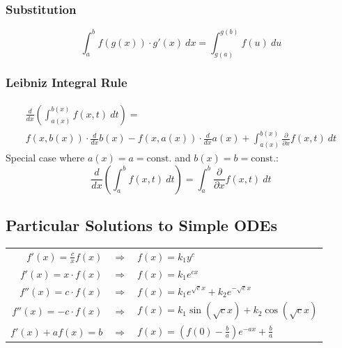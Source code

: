 \subsubsection{Substitution}
\begin{equation*}
    \int_a^b f(g(x))\cdot g'(x)\ dx = \int_{g(a)}^{g(b)}f(u)\ du
\end{equation*}

\subsubsection{Leibniz Integral Rule}
\begin{multline*}
    \frac{d}{dx}\left(\int_{a(x)}^{b(x)}f(x,t)\ dt\right)
    =
    \\
    f(x,b(x))\cdot\frac{d}{dx}b(x)
    -f(x,a(x))\cdot\frac{d}{dx}a(x)
    +\int_{a(x)}^{b(x)}\frac{\partial}{\partial x}f(x,t)\ dt
\end{multline*}
Special case where $a(x)=a=\mathrm{const.}$ and $b(x)=b=\mathrm{const.}$:
\begin{equation*}
    \frac{d}{dx}\left(\int_a^b f(x,t)\ dt\right)
    =\int_a^b\frac{\partial}{\partial x}f(x,t)\ dt
\end{equation*}

\subsection{Particular Solutions to Simple ODEs}

\begin{tabular}[h]{rcl}
    $f'(x)=\frac{c}{x}f(x)$ & $\Rightarrow$ & $f(x)=k_1y^c$                                             \\
    $f'(x)=x\cdot f(x)$     & $\Rightarrow$ & $f(x)=k_1e^{cx}$                                          \\
    $f''(x) = c\cdot f(x)$  & $\Rightarrow$ & $f(x) = k_1e^{\sqrt{c}x}+k_2e^{-\sqrt{c}x}$               \\
    $f''(x) = -c\cdot f(x)$ & $\Rightarrow$ & $f(x)=k_1\sin(\sqrt{c}x)+k_2\cos(\sqrt{c}x)$              \\
    $f'(x)+af(x) = b$       & $\Rightarrow$ & $f(x) = \left(f(0)-\frac{b}{a}\right)e^{-ax}+\frac{b}{a}$
\end{tabular}
